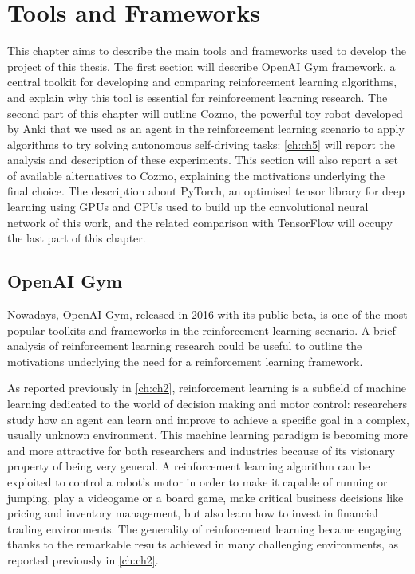 \chapter{Tools and Frameworks} \label{ch:ch3}

This chapter aims to describe the main tools and frameworks used to develop the project of this thesis.
The first section will describe OpenAI Gym framework, a central toolkit for developing and comparing reinforcement learning algorithms, and explain why this tool is essential for reinforcement learning research.
The second part of this chapter will outline Cozmo, the powerful toy robot developed by Anki that we used as an agent in the reinforcement learning scenario to apply algorithms to try solving autonomous self-driving tasks: \vref{ch:ch5} will report the analysis and description of these experiments.
This section will also report a set of available alternatives to Cozmo, explaining the motivations underlying the final choice.
The description about PyTorch, an optimised tensor library for deep learning using GPUs and CPUs used to build up the convolutional neural network of this work, and the related comparison with TensorFlow will occupy the last part of this chapter.

\section{OpenAI Gym}

Nowadays, OpenAI Gym, released in 2016 with its public beta, is one of the most popular toolkits and frameworks in the reinforcement learning scenario.
A brief analysis of reinforcement learning research could be useful to outline the motivations underlying the need for a reinforcement learning framework.

As reported previously in  \vref{ch:ch2}, reinforcement learning is a subfield of machine learning dedicated to the world of decision making and motor control: researchers study how an agent can learn and improve to achieve a specific goal in a complex, usually unknown environment.
This machine learning paradigm is becoming more and more attractive for both researchers and industries because of its visionary property of being very general.
A reinforcement learning algorithm can be exploited to control a robot's motor in order to make it capable of running or jumping, play a videogame or a board game, make critical business decisions like pricing and inventory management, but also learn how to invest in financial trading environments.
The generality of reinforcement learning became engaging thanks to the remarkable results achieved in many challenging environments, as reported previously in \vref{ch:ch2}.

